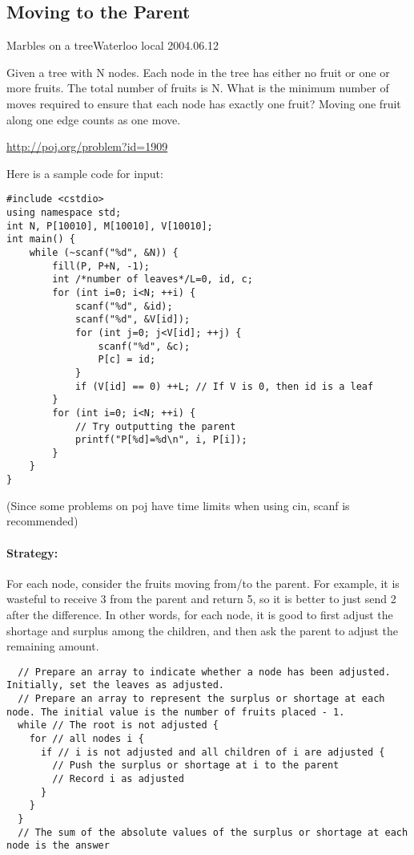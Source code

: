 \subsection{Moving to the Parent}

\begin{pbox}{Marbles on a tree}{Waterloo local 2004.06.12}

Given a tree with N nodes.
Each node in the tree has either no fruit or one or more fruits.
The total number of fruits is N.
What is the minimum number of moves required to ensure that each node has exactly one fruit?
Moving one fruit along one edge counts as one move.
  
\url{http://poj.org/problem?id=1909}
\end{pbox}

Here is a sample code for input:
\begin{cbox}
\begin{verbatim}
#include <cstdio>
using namespace std;
int N, P[10010], M[10010], V[10010];
int main() {
    while (~scanf("%d", &N)) {
        fill(P, P+N, -1);
        int /*number of leaves*/L=0, id, c;
        for (int i=0; i<N; ++i) {
            scanf("%d", &id);
            scanf("%d", &V[id]);
            for (int j=0; j<V[id]; ++j) {
                scanf("%d", &c);
                P[c] = id;
            }
            if (V[id] == 0) ++L; // If V is 0, then id is a leaf
        }
        for (int i=0; i<N; ++i) {
            // Try outputting the parent
            printf("P[%d]=%d\n", i, P[i]);
        }
    }
}
\end{verbatim}
\end{cbox}
(Since some problems on poj have time limits when using cin, scanf is recommended)

\paragraph{Strategy:} For each node, consider the fruits moving from/to the parent. For example, it is wasteful to receive 3 from the parent and return 5, so it is better to just send 2 after the difference. In other words, for each node, it is good to first adjust the shortage and surplus among the children, and then ask the parent to adjust the remaining amount.

\begin{cbox}
\begin{verbatim}
  // Prepare an array to indicate whether a node has been adjusted. Initially, set the leaves as adjusted.
  // Prepare an array to represent the surplus or shortage at each node. The initial value is the number of fruits placed - 1.
  while // The root is not adjusted {
    for // all nodes i {
      if // i is not adjusted and all children of i are adjusted {
        // Push the surplus or shortage at i to the parent
        // Record i as adjusted
      }
    }
  }
  // The sum of the absolute values of the surplus or shortage at each node is the answer
\end{verbatim}
\end{cbox}

